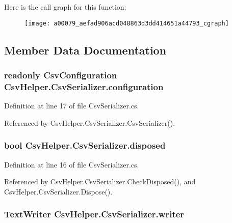 Here is the call graph for this function\-:
\nopagebreak
\begin{figure}[H]
\begin{center}
\leavevmode
\texttt{[image: a00079\_aefad906acd048863d3dd414651a44793\_cgraph]}
\end{center}
\end{figure}




\subsection{Member Data Documentation}
\hypertarget{a00079_ae8c56ff97c0a797245f2205c486833ea}{
\subsubsection[{configuration}]{\setlength{\rightskip}{0pt plus 5cm}readonly {\bf Csv\-Configuration} Csv\-Helper.\-Csv\-Serializer.\-configuration\hspace{0.3cm}{\ttfamily [private]}}}\label{a00079_ae8c56ff97c0a797245f2205c486833ea}


Definition at line 17 of file Csv\-Serializer.\-cs.



Referenced by Csv\-Helper.\-Csv\-Serializer.\-Csv\-Serializer().

\hypertarget{a00079_a2687885dae7f7b0eec3c2db81c05f7e4}{
\subsubsection[{disposed}]{\setlength{\rightskip}{0pt plus 5cm}bool Csv\-Helper.\-Csv\-Serializer.\-disposed\hspace{0.3cm}{\ttfamily [private]}}}\label{a00079_a2687885dae7f7b0eec3c2db81c05f7e4}


Definition at line 16 of file Csv\-Serializer.\-cs.



Referenced by Csv\-Helper.\-Csv\-Serializer.\-Check\-Disposed(), and Csv\-Helper.\-Csv\-Serializer.\-Dispose().

\hypertarget{a00079_adfb235fa2c868fc79c0376fd12fda767}{
\subsubsection[{writer}]{\setlength{\rightskip}{0pt plus 5cm}Text\-Writer Csv\-Helper.\-Csv\-Serializer.\-writer\hspace{0.3cm}{\ttfamily [private]}}}\label{a00079_adfb235fa2c868fc79c0376fd12fda767}


